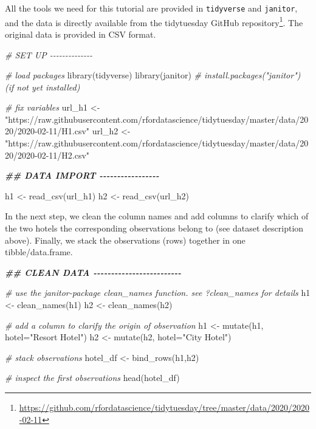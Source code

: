 \documentclass[
  12pt,
]{style/krantz}
\newenvironment{Shaded}{\begin{snugshade}}{\end{snugshade}}
\newcommand{\AttributeTok}[1]{\textcolor[rgb]{0.77,0.63,0.00}{#1}}
\newcommand{\CommentTok}[1]{\textcolor[rgb]{0.56,0.35,0.01}{\textit{#1}}}
\newcommand{\DocumentationTok}[1]{\textcolor[rgb]{0.56,0.35,0.01}{\textbf{\textit{#1}}}}
\newcommand{\FunctionTok}[1]{\textcolor[rgb]{0.00,0.00,0.00}{#1}}
\newcommand{\NormalTok}[1]{#1}
\newcommand{\OtherTok}[1]{\textcolor[rgb]{0.56,0.35,0.01}{#1}}
\newcommand{\StringTok}[1]{\textcolor[rgb]{0.31,0.60,0.02}{#1}}
\renewcommand{\href}[2]{#2\footnote{\url{#1}}}
\begin{document}
All the tools we need for this tutorial are provided in \texttt{tidyverse} and \texttt{janitor}, and the data is directly available from the \href{https://github.com/rfordatascience/tidytuesday/tree/master/data/2020/2020-02-11}{tidytuesday GitHub repository}. The original data is provided in CSV format.

\begin{Shaded}
\begin{Highlighting}[]
\CommentTok{\# SET UP {-}{-}{-}{-}{-}{-}{-}{-}{-}{-}{-}{-}{-}{-}}

\CommentTok{\# load packages}
\FunctionTok{library}\NormalTok{(tidyverse)}
\FunctionTok{library}\NormalTok{(janitor) }\CommentTok{\# install.packages("janitor") (if not yet installed)}

\CommentTok{\# fix variables}
\NormalTok{url\_h1 }\OtherTok{\textless{}{-}} \StringTok{"https://raw.githubusercontent.com/rfordatascience/tidytuesday/master/data/2020/2020{-}02{-}11/H1.csv"}
\NormalTok{url\_h2 }\OtherTok{\textless{}{-}} \StringTok{"https://raw.githubusercontent.com/rfordatascience/tidytuesday/master/data/2020/2020{-}02{-}11/H2.csv"}

\DocumentationTok{\#\# DATA IMPORT {-}{-}{-}{-}{-}{-}{-}{-}{-}{-}{-}{-}{-}{-}{-}{-}{-}}

\NormalTok{h1 }\OtherTok{\textless{}{-}} \FunctionTok{read\_csv}\NormalTok{(url\_h1)}
\NormalTok{h2 }\OtherTok{\textless{}{-}} \FunctionTok{read\_csv}\NormalTok{(url\_h2)}
\end{Highlighting}
\end{Shaded}

In the next step, we clean the column names and add columns to clarify which of the two hotels the corresponding observations belong to (see dataset description above). Finally, we stack the observations (rows) together in one tibble/data.frame.

\begin{Shaded}
\begin{Highlighting}[]
\DocumentationTok{\#\# CLEAN DATA {-}{-}{-}{-}{-}{-}{-}{-}{-}{-}{-}{-}{-}{-}{-}{-}{-}{-}{-}{-}{-}{-}{-}{-}{-}}

\CommentTok{\# use the janitor{-}package clean\_names function. see ?clean\_names for details}
\NormalTok{h1 }\OtherTok{\textless{}{-}} \FunctionTok{clean\_names}\NormalTok{(h1)}
\NormalTok{h2 }\OtherTok{\textless{}{-}} \FunctionTok{clean\_names}\NormalTok{(h2)}

\CommentTok{\# add a column to clarify the origin of observation}
\NormalTok{h1 }\OtherTok{\textless{}{-}} \FunctionTok{mutate}\NormalTok{(h1, }\AttributeTok{hotel=}\StringTok{"Resort Hotel"}\NormalTok{)}
\NormalTok{h2 }\OtherTok{\textless{}{-}} \FunctionTok{mutate}\NormalTok{(h2, }\AttributeTok{hotel=}\StringTok{"City Hotel"}\NormalTok{)}

\CommentTok{\# stack observations}
\NormalTok{hotel\_df }\OtherTok{\textless{}{-}} \FunctionTok{bind\_rows}\NormalTok{(h1,h2)}

\CommentTok{\# inspect the first observations}
\FunctionTok{head}\NormalTok{(hotel\_df)}
\end{Highlighting}
\end{Shaded}
\end{document}
